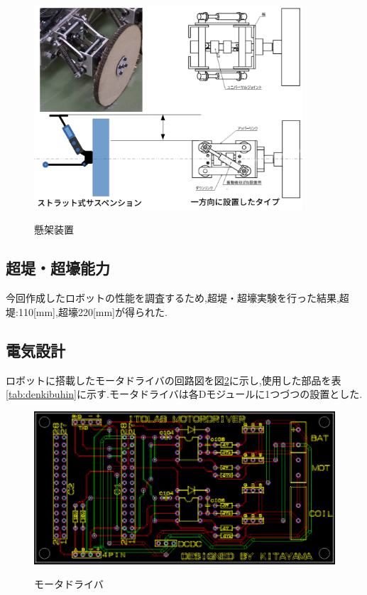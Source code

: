 \documentclass[12pt,oneside]{sotsuken_paper}
\begin{document}
\begin{figure}[htp] 
 \begin{center} 
  \includegraphics[width=100mm]{img/hard/3.png} 
 　\caption{懸架装置} 
  \label{fig:kenka}%
 \end{center} 
\end{figure} 


\subsection{超堤・超壕能力} 
今回作成したロボットの性能を調査するため,超堤・超壕実験を行った結果,超堤:110[mm],超壕220[mm]が得られた. 

\subsection{電気設計} 
ロボットに搭載したモータドライバの回路図を図\ref{fig:denkikairo}に示し,使用した部品を表\ref{tab:denkibuhin}に示す.モータドライバは各Dモジュールに1つづつの設置とした. 

\begin{figure}[htp] 
 \begin{center} 
  \includegraphics[width=150mm]{img/hard/denkikairo.png} 
 　\caption{モータドライバ} 
  \label{fig:denkikairo}%
 \end{center} 
\end{figure} 
\end{document}
